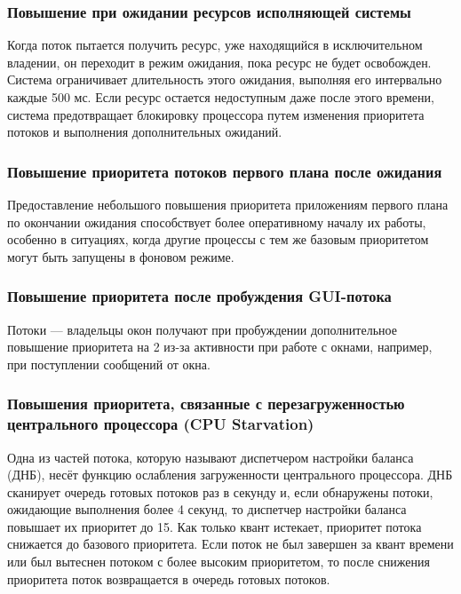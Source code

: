 \subsubsection*{Повышение при ожидании ресурсов исполняющей системы}

Когда поток пытается получить ресурс, уже находящийся в исключительном владении, он переходит в режим ожидания, пока ресурс не будет освобожден. 
Система ограничивает длительность этого ожидания, выполняя его интервально каждые 500 мс. 
Если ресурс остается недоступным даже после этого времени, система предотвращает блокировку процессора путем изменения приоритета потоков и выполнения дополнительных ожиданий.

\subsubsection*{Повышение приоритета потоков первого плана после ожидания}

Предоставление небольшого повышения приоритета приложениям первого плана по окончании ожидания способствует более оперативному началу их работы, особенно в ситуациях, когда другие процессы с тем же базовым приоритетом могут быть запущены в фоновом режиме.

\subsubsection*{Повышение приоритета после пробуждения GUI-потока}

Потоки --- владельцы окон получают при пробуждении дополнительное повышение приоритета на 2 из-за активности при работе с окнами, например, при поступлении сообщений от окна.

\subsubsection*{Повышения приоритета, связанные с перезагруженностью центрального процессора (CPU Starvation)}

Одна из частей потока, которую называют диспетчером настройки баланса (ДНБ), несёт функцию  ослабления загруженности центрального процессора. 
ДНБ сканирует очередь готовых потоков раз в секунду и, если обнаружены потоки, ожидающие выполнения более 4 секунд, то диспетчер настройки баланса повышает их приоритет до 15. 
Как только квант истекает, приоритет потока снижается до базового приоритета. 
Если поток не был завершен за квант времени или был вытеснен потоком с более высоким приоритетом, то после снижения приоритета поток возвращается в очередь готовых потоков.


